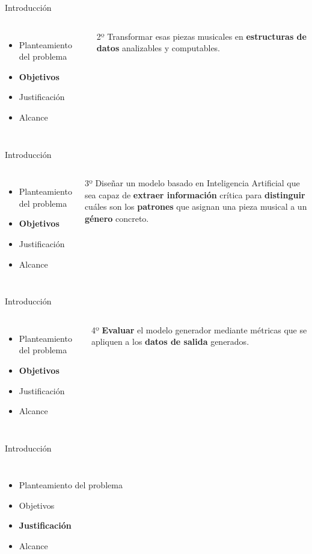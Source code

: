 \documentclass{beamer}
\begin{document}
\begin{frame}{Introducción}
  \begin{columns}
  \column{5.5cm}
  \begin{itemize}
    \item Planteamiento del problema
    \item \textbf{Objetivos}
    \item Justificación
    \item Alcance
  \end{itemize}
  \column{6cm}
  2º Transformar esas piezas musicales en \textbf{estructuras de datos} analizables y computables.
  \end{columns}
\end{frame}

\begin{frame}{Introducción}
  \begin{columns}
  \column{5.5cm}
  \begin{itemize}
    \item Planteamiento del problema
    \item \textbf{Objetivos}
    \item Justificación
    \item Alcance
  \end{itemize}
  \column{6cm}
  3º Diseñar un modelo basado en Inteligencia Artificial que sea capaz de \textbf{extraer información} crítica para \textbf{distinguir} cuáles son los \textbf{patrones} que asignan una pieza musical a un \textbf{género} concreto.
  \end{columns}
\end{frame}

\begin{frame}{Introducción}
  \begin{columns}
  \column{5.5cm}
  \begin{itemize}
    \item Planteamiento del problema
    \item \textbf{Objetivos}
    \item Justificación
    \item Alcance
  \end{itemize}
  \column{6cm}
  4º \textbf{Evaluar} el modelo generador mediante métricas que se apliquen a los \textbf{datos de salida} generados.
  \end{columns}
\end{frame}
\begin{frame}{Introducción}
\begin{columns}
\column{5.5cm}
\begin{itemize}
  \item Planteamiento del problema
  \item Objetivos
  \item \textbf{Justificación}
  \item Alcance
\end{itemize}
\column{6cm}
\end{columns}
\end{frame}
\end{document}
